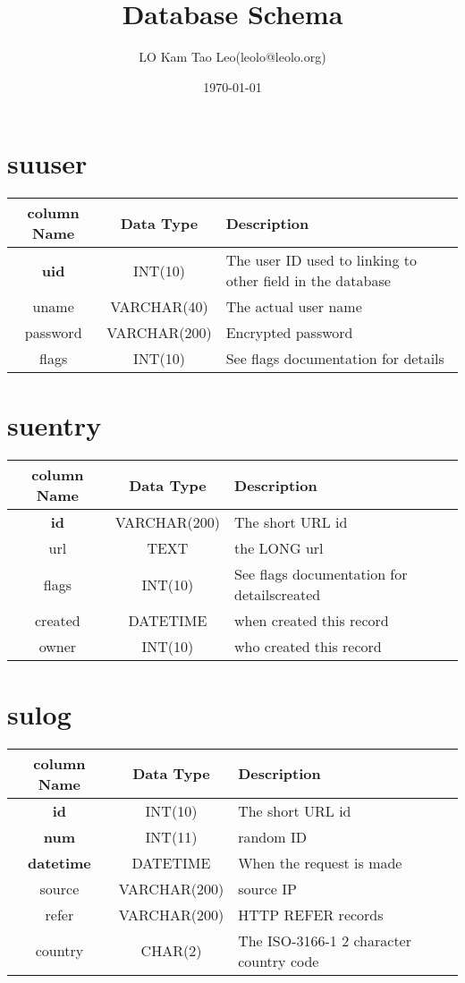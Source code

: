 \documentclass[a4paper,12pt,hidelinks]{article}
\title{Database Schema}
\author{LO Kam Tao Leo(leolo@leolo.org)}
\date{\today}
\begin{document}
\maketitle
\section{su\textunderscore user}
\begin{tabular}{c|c|p{9cm}}
column Name & Data Type &  Description \\ \hline
 \textbf{uid} & INT(10) & The user ID used to linking to other field in the database \\\hline
 uname & VARCHAR(40) &  The actual user name\\\hline
 password & VARCHAR(200) & Encrypted password\\\hline
 flags & INT(10) & See flags documentation for details
\end{tabular}\section{su\textunderscore entry}
\begin{tabular}{c|c|p{9cm}}
column Name & Data Type &  Description \\ \hline
 \textbf{id} & VARCHAR(200) & The short URL id \\\hline
 url & TEXT & the LONG url\\\hline
 flags & INT(10) & See flags documentation for detailscreated\\\hline
 created & DATETIME & when created this record \\\hline
 owner & INT(10) & who created this record 
\end{tabular}\section{su\textunderscore log}
\begin{tabular}{c|c|p{9cm}}
column Name & Data Type &  Description \\ \hline
 \textbf{id} & INT(10) & The short URL id \\\hline
 \textbf{num} & INT(11) & random ID\\\hline
 \textbf{datetime} & DATETIME & When the request is made\\\hline
 source & VARCHAR(200) & source IP\\\hline
 refer & VARCHAR(200) & HTTP REFER records\\\hline
 country & CHAR(2) & The ISO-3166-1 2 character country code 
\end{tabular}
\end{document}
